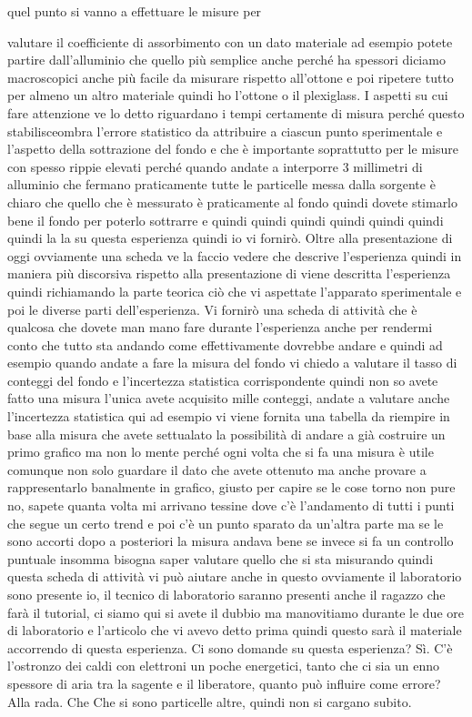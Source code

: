 quel punto si vanno a effettuare le misure per 

valutare il coefficiente di assorbimento con un dato materiale ad esempio potete partire dall'alluminio che quello più semplice anche perché ha spessori diciamo macroscopici anche più facile da misurare rispetto all'ottone e poi ripetere tutto per almeno un altro materiale quindi ho l'ottone o il plexiglass. I aspetti su cui fare attenzione ve lo detto riguardano i tempi certamente di misura perché questo stabilisceombra l'errore statistico da attribuire a ciascun punto sperimentale e l'aspetto della sottrazione del fondo e che è importante soprattutto per le misure con spesso rippie elevati perché quando andate a interporre 3 millimetri di alluminio che fermano praticamente tutte le particelle messa dalla sorgente è chiaro che quello che è messurato è praticamente al fondo quindi dovete stimarlo bene il fondo per poterlo sottrarre e quindi quindi quindi quindi quindi quindi quindi la la su questa esperienza quindi io vi fornirò. Oltre alla presentazione di oggi ovviamente una scheda ve la faccio vedere che descrive l'esperienza quindi in maniera più discorsiva rispetto alla presentazione di viene descritta l'esperienza quindi richiamando la parte teorica ciò che vi aspettate l'apparato sperimentale e poi le diverse parti dell'esperienza. Vi fornirò una scheda di attività che è qualcosa che dovete man mano fare durante l'esperienza anche per rendermi conto che tutto sta andando come effettivamente dovrebbe andare e quindi ad esempio quando andate a fare la misura del fondo vi chiedo a valutare il tasso di conteggi del fondo e l'incertezza statistica corrispondente quindi non so avete fatto una misura l'unica avete acquisito mille conteggi, andate a valutare anche l'incertezza statistica qui ad esempio vi viene fornita una tabella da riempire in base alla misura che avete settualato la possibilità di andare a già costruire un primo grafico ma non lo mente perché ogni volta che si fa una misura è utile comunque non solo guardare il dato che avete ottenuto ma anche provare a rappresentarlo banalmente in grafico, giusto per capire se le cose torno non pure no, sapete quanta volta mi arrivano tessine dove c'è l'andamento di tutti i punti che segue un certo trend e poi c'è un punto sparato da un'altra parte ma se le sono accorti dopo a posteriori la misura andava bene se invece si fa un controllo puntuale insomma bisogna saper valutare quello che si sta misurando quindi questa scheda di attività vi può aiutare anche in questo ovviamente il laboratorio sono presente io, il tecnico di laboratorio saranno presenti anche il ragazzo che farà il tutorial, ci siamo qui si avete il dubbio ma manovitiamo durante le due ore di laboratorio e l'articolo che vi avevo detto prima quindi questo sarà il materiale accorrendo di questa esperienza. Ci sono domande su questa esperienza? Sì. C'è l'ostronzo dei caldi con elettroni un poche energetici, tanto che ci sia un enno spessore di aria tra la sagente e il liberatore, quanto può influire come errore? Alla rada. Che Che si sono particelle altre, quindi non si cargano subito.

